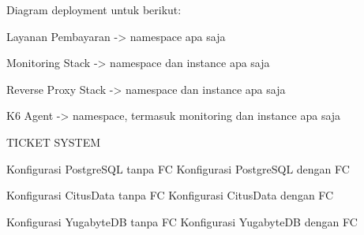Diagram deployment untuk berikut:

Layanan Pembayaran -> namespace apa saja

Monitoring Stack -> namespace dan instance apa saja 

Reverse Proxy Stack -> namespace dan instance apa saja 

K6 Agent -> namespace, termasuk monitoring dan instance apa saja

TICKET SYSTEM

Konfigurasi PostgreSQL tanpa FC
Konfigurasi PostgreSQL dengan FC

Konfigurasi CitusData tanpa FC
Konfigurasi CitusData dengan FC

Konfigurasi YugabyteDB tanpa FC
Konfigurasi YugabyteDB dengan FC
